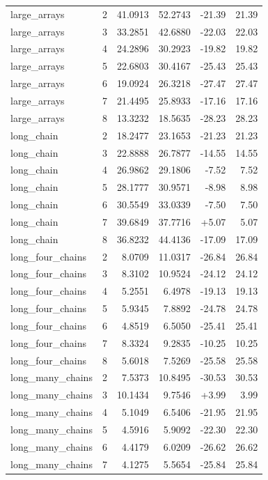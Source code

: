\begin{center}
\begin{longtable}{lrrrrr}
large\_arrays & 2 & 41.0913 & 52.2743 & -21.39 & 21.39 \\
large\_arrays & 3 & 33.2851 & 42.6880 & -22.03 & 22.03 \\
large\_arrays & 4 & 24.2896 & 30.2923 & -19.82 & 19.82 \\
large\_arrays & 5 & 22.6803 & 30.4167 & -25.43 & 25.43 \\
large\_arrays & 6 & 19.0924 & 26.3218 & -27.47 & 27.47 \\
large\_arrays & 7 & 21.4495 & 25.8933 & -17.16 & 17.16 \\
large\_arrays & 8 & 13.3232 & 18.5635 & -28.23 & 28.23 \\
long\_chain & 2 & 18.2477 & 23.1653 & -21.23 & 21.23 \\
long\_chain & 3 & 22.8888 & 26.7877 & -14.55 & 14.55 \\
long\_chain & 4 & 26.9862 & 29.1806 & -7.52 & 7.52 \\
long\_chain & 5 & 28.1777 & 30.9571 & -8.98 & 8.98 \\
long\_chain & 6 & 30.5549 & 33.0339 & -7.50 & 7.50 \\
long\_chain & 7 & 39.6849 & 37.7716 & +5.07 & 5.07 \\
long\_chain & 8 & 36.8232 & 44.4136 & -17.09 & 17.09 \\
long\_four\_chains & 2 & 8.0709 & 11.0317 & -26.84 & 26.84 \\
long\_four\_chains & 3 & 8.3102 & 10.9524 & -24.12 & 24.12 \\
long\_four\_chains & 4 & 5.2551 & 6.4978 & -19.13 & 19.13 \\
long\_four\_chains & 5 & 5.9345 & 7.8892 & -24.78 & 24.78 \\
long\_four\_chains & 6 & 4.8519 & 6.5050 & -25.41 & 25.41 \\
long\_four\_chains & 7 & 8.3324 & 9.2835 & -10.25 & 10.25 \\
long\_four\_chains & 8 & 5.6018 & 7.5269 & -25.58 & 25.58 \\
long\_many\_chains & 2 & 7.5373 & 10.8495 & -30.53 & 30.53 \\
long\_many\_chains & 3 & 10.1434 & 9.7546 & +3.99 & 3.99 \\
long\_many\_chains & 4 & 5.1049 & 6.5406 & -21.95 & 21.95 \\
long\_many\_chains & 5 & 4.5916 & 5.9092 & -22.30 & 22.30 \\
long\_many\_chains & 6 & 4.4179 & 6.0209 & -26.62 & 26.62 \\
long\_many\_chains & 7 & 4.1275 & 5.5654 & -25.84 & 25.84 \\

\end{longtable}
\end{center}
